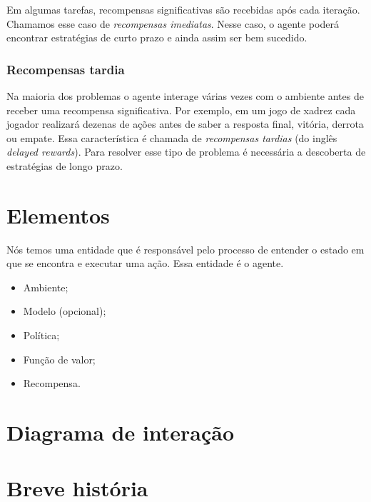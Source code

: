 \documentclass{article}
\begin{document}
                Em algumas tarefas, recompensas significativas são recebidas após cada iteração. Chamamos esse caso de \emph{recompensas imediatas}. Nesse caso, o agente poderá encontrar estratégias de curto prazo e ainda assim ser bem sucedido.
        
            \subsubsection{Recompensas tardia}
        
                Na maioria dos problemas o agente interage várias vezes com o ambiente antes de receber uma recompensa significativa. Por exemplo, em um jogo de xadrez cada jogador realizará dezenas de ações antes de saber a resposta final, vitória, derrota ou empate. Essa característica é chamada de \emph{recompensas tardias} (do inglês \emph{delayed rewards}). Para resolver esse tipo de problema é necessária a descoberta de estratégias de longo prazo.
        
    \section{Elementos}
    
        Nós temos uma entidade que é responsável pelo processo de entender o estado em que se encontra e executar uma ação. Essa entidade é o agente. 
    
        \begin{itemize}
            \item Ambiente;
            \item Modelo (opcional);
            \item Política;
            \item Função de valor;
            \item Recompensa.
        \end{itemize}
        
    \section{Diagrama de interação}
    
        \begin{center}
            \rlinteraction
        \end{center}
    
    \section{Breve história}
    
\end{document}
